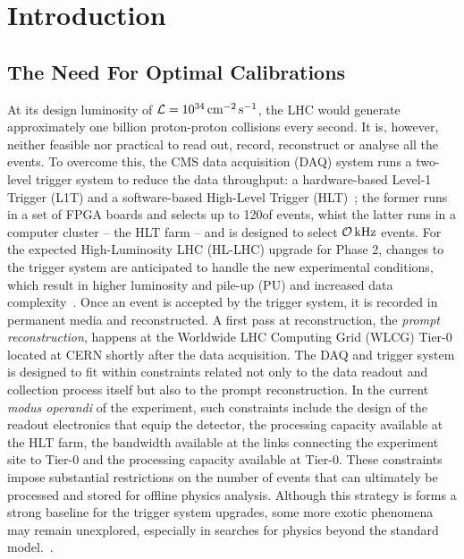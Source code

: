 \chapter{Introduction}

\section{The Need For Optimal Calibrations}
At its design luminosity of $\mathcal{L} = 10^{34}\,\text{cm}^{-2}\,\text{s}^{-1}$, the LHC would generate approximately one billion proton-proton collisions every second. It is, however, neither feasible nor practical to read out, record, reconstruct or analyse all the events. To overcome this, the CMS data acquisition (DAQ) system \cite{CMScollab, hayrapetyan2023development} runs a two-level trigger system to reduce the data throughput: a hardware-based Level-1 Trigger (L1T) and a software-based High-Level Trigger (HLT)~\cite{CMS:2016ngn}; the former runs in a set of FPGA boards and selects up to 120\kHz of events, whist the latter runs in a computer cluster -- the HLT farm -- and is designed to select $\mathcal{O}\,\text{kHz}$ events. For the expected High-Luminosity LHC (HL-LHC) upgrade for Phase 2, changes to the trigger system are anticipated to handle the new experimental conditions, which result in higher luminosity and pile-up (PU) and increased data complexity~\cite{Collaboration:2759072, CERN-LHCC-2020-004}. 
\newline \newline
Once an event is accepted by the trigger system, it is recorded in permanent media and reconstructed. A first pass at reconstruction, the \emph{prompt reconstruction}, happens at the Worldwide LHC Computing Grid (WLCG) Tier-0 located at CERN shortly after the data acquisition. The DAQ and trigger system is designed to fit within constraints related not only to the data readout and collection process itself but also to the prompt reconstruction.
\newline \newline
In the current \textit{modus operandi} of the experiment, such constraints include the design of the readout electronics that equip the detector, the processing capacity available at the HLT farm, the bandwidth available at the links connecting the experiment site to Tier-0 and the processing capacity available at Tier-0. These constraints impose substantial restrictions on the number of events that can ultimately be processed and stored for offline physics analysis. Although this strategy is forms a strong baseline for the trigger system upgrades, some more exotic phenomena may remain unexplored, especially in searches for physics beyond the standard model.~\cite{cms_exotica_summary_plots}.
